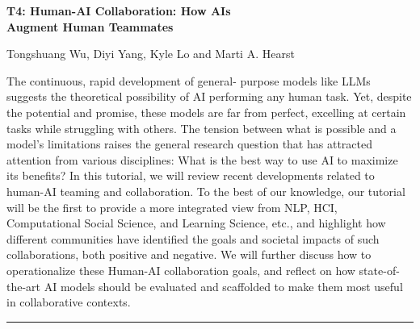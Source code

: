 \begin{center}
    \Large{\textbf{T4: Human-AI Collaboration: How AIs \\
    Augment Human Teammates}\\}
    \par\bigskip
    \large{Tongshuang Wu, Diyi Yang, Kyle Lo and Marti A. Hearst}\\
    \par\bigskip

\end{center}

The continuous, rapid development of general- purpose models like LLMs suggests the theoretical possibility of AI performing any human task. 
Yet, despite the potential and promise, these models are far from perfect, excelling at certain tasks while struggling with others. 
The tension between what is possible and a model's limitations raises the general research question that has attracted attention from various disciplines: What is the best way to use AI to maximize its benefits? In this tutorial, we will review recent developments related to human-AI teaming and collaboration. 
To the best of our knowledge, our tutorial will be the first to provide a more integrated view from NLP, HCI, Computational Social Science, and Learning Science, etc., and highlight how different communities have identified the goals and societal impacts of such collaborations, both positive and negative. We will further discuss how to operationalize these Human-AI collaboration goals, and reflect on how state-of-the-art AI models should be evaluated and scaffolded to make them most useful in collaborative contexts.
\begin{center}
    \noindent\rule{200px}{1pt}
\end{center}
